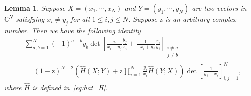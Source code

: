 \documentclass{article}
\newtheorem{lm}[thm]{Lemma}
\numberwithin{equation}{section}
\newcommand{\complexC}{\mathbb{C}}
\newcommand{\rz}{\mathrm{z}}
\begin{document}
\begin{lm}
	\label{lem:Cauchy_generalization}
	Suppose $X=(x_1,\cdots,x_N)$ and $Y=(y_1,\cdots,y_N)$ are two vectors in $\complexC^N$ satisfying $x_i\ne y_j$ for all $1\le i,j\le N$. Suppose $\rz$ is an arbitrary complex number. Then we have the following identity
	\begin{equation}
		\label{eq:Cauchy_generalization}
		\begin{split}
		&\sum_{a,b=1}^N (-1)^{a +b}
		   y_b \det\left[ \frac{\rz}{ x_i-y_j} \frac{y_j}{x_i}
		                        +\frac{1}{-x_i+y_j}\frac{x_i}{y_j}   
		                  \right]_{\substack{i\ne a\\ j\ne b}}\\
		                  &
		=(1-\rz)^{N-2}\left(\hat H(X;Y)+\rz\prod_{i=1}^N\frac{y_i}{x_i}\hat H(Y;X)\right)\det\left[\frac{1}{y_j-x_i}\right]_{i,j=1}^N,
		\end{split}
	\end{equation}
where $\hat H$ is defined in~\eqref{eq:hat_H}.
\end{lm}
\end{document}
